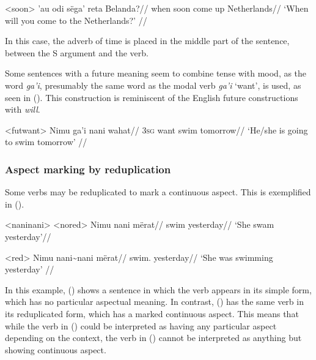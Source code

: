 \documentclass[../hewa_main-subfiles.tex]{subfiles}
\begin{document}
\ex<soon> %
\begingl %
 'au odi sëga' reta Belanda?//
\glb when \Second{}\Sg{} soon come up Netherlands//
\glft `When will you come to the Netherlands?' // 
\endgl
\xe

In this case, the adverb of time is placed in the middle part of the sentence, between the S argument and the verb.

Some sentences with a future meaning seem to combine tense with mood, as the word \textit{ga'i}, presumably the same word as the modal verb \textit{ga'i} `want', is used, as seen in (). This construction is reminiscent of the English future constructions with \textit{will}.

\ex<futwant>
\begingl %
\gla Nimu ga'i nani wahat//
\glb \textsc{3sg} want swim tomorrow//
\glft `He/she is going to swim tomorrow' // 
\endgl
\xe

\subsubsection{Aspect marking by reduplication}

Some verbs may be reduplicated to mark a continuous aspect. This is exemplified in ().

\pex<naninani> %
\a<nored> %
\begingl %
\gla Nimu nani mërat//
\glb \Third{}\Sg{} swim yesterday//
\glft `She swam yesterday'// 
\endgl

\a<red> %
\begingl %
\gla Nimu nani\textasciitilde nani mërat//
\glb \Third{}\Sg{} swim.\Rdp{} yesterday//
\glft `She was swimming yesterday' // 
\endgl
\xe

In this example, () shows a sentence in which the verb appears in its simple form, which has no particular aspectual meaning. In contrast, () has the same verb in its reduplicated form, which has a marked continuous aspect. This means that while the verb in () could be interpreted as having any particular aspect depending on the context, the verb in () cannot be interpreted as anything but showing continuous aspect.


\end{document}
